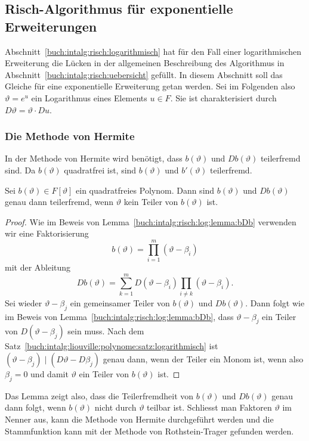%
%
\subsection{Risch-Algorithmus für exponentielle Erweiterungen
\label{buch:intalg:risch:exponentiell}}
Abschnitt~\ref{buch:intalg:risch:logarithmisch} hat für den Fall einer
logarithmischen Erweiterung die Lücken in der allgemeinen Beschreibung
des Algorithmus in Abschnitt~\ref{buch:intalg:risch:uebersicht} gefüllt.
In diesem Abschnitt soll das Gleiche für eine exponentielle Erweiterung
getan werden.
Sei im Folgenden also $\vartheta=e^u$ ein Logarithmus eines Elements
$u\in F$.
Sie ist charakterisiert durch $D\vartheta = \vartheta\cdot Du$.

%
%
\subsubsection{Die Methode von Hermite}
In der Methode von Hermite wird benötigt, dass $b(\vartheta)$ und
$Db(\vartheta)$ teilerfremd sind.
Da $b(\vartheta)$ quadratfrei ist, sind $b(\vartheta)$ und $b'(\vartheta)$
teilerfremd.

\begin{lemma}
\label{buch:intalg:risch:exp:lemma:bDb}
Sei $b(\vartheta)\in F[\vartheta]$ ein quadratfreies Polynom.
Dann sind $b(\vartheta)$ und $Db(\vartheta)$ genau dann teilerfremd,
wenn $\vartheta$ kein Teiler von $b(\vartheta)$ ist.
\end{lemma}

\begin{proof}
Wie im Beweis von Lemma~\ref{buch:intalg:risch:log:lemma:bDb} verwenden
wir eine Faktorisierung
\[
b(\vartheta) = \prod_{i=1}^m (\vartheta-\beta_i)
\]
mit der Ableitung
\[
Db(\vartheta)
=
\sum_{k=1}^m D(\vartheta-\beta_i)\prod_{i\ne k} (\vartheta-\beta_i).
\]
Sei wieder $\vartheta-\beta_j$ ein gemeinsamer Teiler von $b(\vartheta)$
und $Db(\vartheta)$.
Dann folgt wie im Beweis von Lemma~\ref{buch:intalg:risch:log:lemma:bDb},
dass $\vartheta-\beta_j$ ein Teiler von $D(\vartheta-\beta_j)$ sein muss.
Nach dem Satz~\ref{buch:intalg:liouville:polynome:satz:logarithmisch} ist
$(\vartheta-\beta_j)\mid (D\vartheta-D\beta_j)$ genau dann, wenn der Teiler ein
Monom ist, wenn also $\beta_j=0$ und damit $\vartheta$ ein Teiler von
$b(\vartheta)$ ist.
\end{proof}

Das Lemma zeigt also, dass die Teilerfremdheit von $b(\vartheta)$ und
$Db(\vartheta)$ genau dann folgt, wenn $b(\vartheta)$ nicht durch
$\vartheta$ teilbar ist.
Schliesst man Faktoren $\vartheta$ im Nenner aus, kann die Methode von
Hermite durchgeführt werden und die Stammfunktion kann mit der Methode
von Rothstein-Trager gefunden werden.

